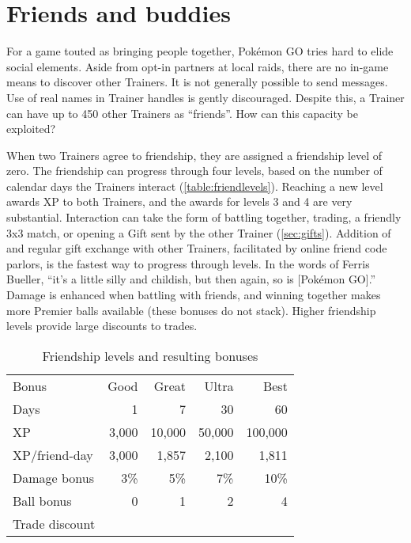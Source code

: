 \chapter{Friends and buddies}
\label{chap:friends}
For a game touted as bringing people together, Pokémon GO tries hard to elide social elements.
Aside from opt-in partners at local raids, there are no in-game means to discover other Trainers.
It is not generally possible to send messages.
Use of real names in Trainer handles is gently discouraged.
Despite this, a Trainer can have up to 450 other Trainers as ``friends''.
How can this capacity be exploited?

When two Trainers agree to friendship, they are assigned a friendship level of zero.
The friendship can progress through four levels, based on the number of calendar
  days the Trainers interact (\autoref{table:friendlevels}).
Reaching a new level awards XP to both Trainers, and the awards for levels 3 and 4 are very substantial.
Interaction can take the form of battling together, trading, a friendly 3x3 match, or
  opening a Gift sent by the other Trainer (\autoref{sec:gifts}).
Addition of and regular gift exchange with other Trainers, facilitated by online friend code parlors,
  is the fastest way to progress through levels.
In the words of Ferris Bueller, ``it's a little silly and childish, but then again, so is [Pokémon GO].''
Damage is enhanced when battling with friends, and winning together
  makes more Premier balls available (these bonuses do not stack).
Higher friendship levels provide large discounts to trades.
\begin{table}
\centering
\begin{tabular}{lrrrr}
Bonus & Good & Great & Ultra & Best\\
\Midrule
Days & 1 & 7 & 30 & 60\\
XP  & 3,000 & 10,000 & 50,000 & 100,000\\
XP/friend-day & 3,000 & 1,857 & 2,100 & 1,811\\
Damage bonus & 3\% & 5\% & 7\% & 10\%\\
Ball bonus & 0 & 1 & 2 & 4\\
Trade discount & & & & \\
\end{tabular}
\caption{Friendship levels and resulting bonuses}
\label{table:friendlevels}
\end{table}


